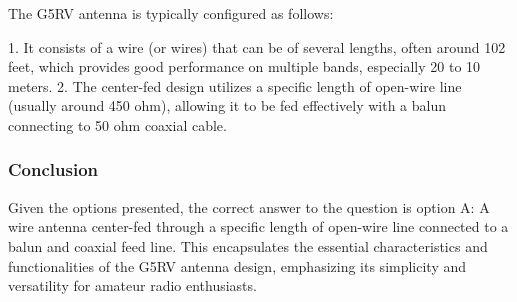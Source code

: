 The G5RV antenna is typically configured as follows:

1. It consists of a wire (or wires) that can be of several lengths, often around 102 feet, which provides good performance on multiple bands, especially 20 to 10 meters.
2. The center-fed design utilizes a specific length of open-wire line (usually around 450 ohm), allowing it to be fed effectively with a balun connecting to 50 ohm coaxial cable.


\subsubsection*{Conclusion}

Given the options presented, the correct answer to the question is option A: A wire antenna center-fed through a specific length of open-wire line connected to a balun and coaxial feed line. This encapsulates the essential characteristics and functionalities of the G5RV antenna design, emphasizing its simplicity and versatility for amateur radio enthusiasts.
